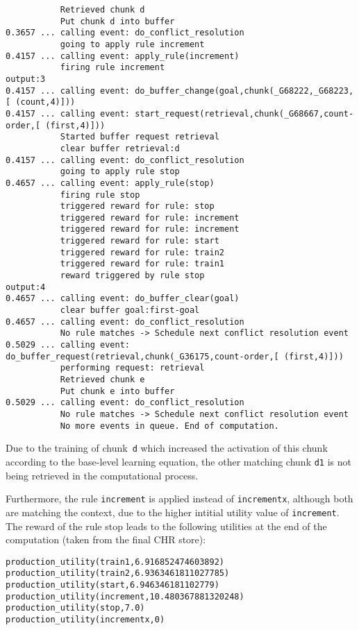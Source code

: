 \begin{lstlisting}
           Retrieved chunk d
           Put chunk d into buffer
0.3657 ... calling event: do_conflict_resolution
           going to apply rule increment
0.4157 ... calling event: apply_rule(increment)
           firing rule increment
output:3
0.4157 ... calling event: do_buffer_change(goal,chunk(_G68222,_G68223,[ (count,4)]))
0.4157 ... calling event: start_request(retrieval,chunk(_G68667,count-order,[ (first,4)]))
           Started buffer request retrieval
           clear buffer retrieval:d
0.4157 ... calling event: do_conflict_resolution
           going to apply rule stop
0.4657 ... calling event: apply_rule(stop)
           firing rule stop
           triggered reward for rule: stop
           triggered reward for rule: increment
           triggered reward for rule: increment
           triggered reward for rule: start
           triggered reward for rule: train2
           triggered reward for rule: train1
           reward triggered by rule stop
output:4
0.4657 ... calling event: do_buffer_clear(goal)
           clear buffer goal:first-goal
0.4657 ... calling event: do_conflict_resolution
           No rule matches -> Schedule next conflict resolution event
0.5029 ... calling event: do_buffer_request(retrieval,chunk(_G36175,count-order,[ (first,4)]))
           performing request: retrieval
           Retrieved chunk e
           Put chunk e into buffer
0.5029 ... calling event: do_conflict_resolution
           No rule matches -> Schedule next conflict resolution event
           No more events in queue. End of computation.
\end{lstlisting}

Due to the training of chunk~\lstinline|d| which increased the activation of this chunk according to the base-level learning equation, the other matching chunk \lstinline|d1| is not being retrieved in the computational process.

Furthermore, the rule \lstinline|increment| is applied instead of \lstinline|incrementx|, although both are matching the context, due to the higher intitial utility value of \lstinline|increment|. The reward of the rule stop leads to the following utilities at the end of the computation (taken from the final CHR store):

\begin{lstlisting}
production_utility(train1,6.916852474603892)
production_utility(train2,6.9363461811027785)
production_utility(start,6.946346181102779)
production_utility(increment,10.480367881320248)
production_utility(stop,7.0)
production_utility(incrementx,0)
\end{lstlisting}

